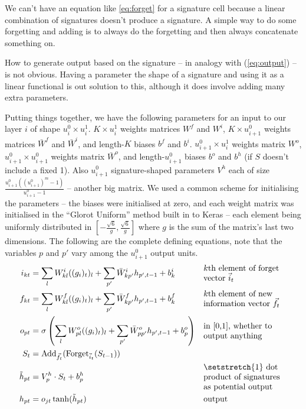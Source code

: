 We can't have an equation like \eqref{eq:forget} for a signature cell because a linear combination of signatures doesn't produce a signature. A simple way to do some forgetting and adding is to always do the forgetting and then always concatenate something on.

How to generate output based on the signature -- in analogy with (\ref*{eq:output}) -- is not obvious. Having a parameter the shape of a signature and using it as a linear functional is out solution to this, although it does involve adding many extra parameters.

Putting things together, we have the following parameters for an input to our layer $i$ of shape $u_i^0\times u_i^1$. $K\times u_i^1$ weights matrices $W^f$ and $W^i$, $K\times u_{i+1}^0$ weights matrices $\bar W^f$ and $\bar W^i$, and length-$K$ biases $b^f$ and $b^i$. $u_{i+1}^0\times u_i^1$ weights matrix $W^o$, $u_{i+1}^0\times u_{i+1}^0$ weights matrix $\bar W^o$, and length-$u_{i+1}^0$ biases $b^o$ and $b^h$ (if $S$ doesn't include a fixed 1). Also $u_{i+1}^0$ signature-shaped parameters $V^h$ each of size $\frac{u_{i+1}^0((u_{i+1}^0)^m-1)}{u_{i+1}^0-1}$ -- another big matrix. 
We used a common scheme for initialising the parameters -- the biases were initialised at zero, and each weight matrix was initialised in the ``Glorot Uniform'' method built in to Keras -- each element being uniformly distributed in $[-\frac{\sqrt 6}{g},\frac{\sqrt 6}{g}]$ where $g$ is the sum of the matrix's last two dimensions. The following are the complete defining equations, note that the variables $p$ and $p'$ vary among the $u_{i+1}^0$ output units.
\begin{align}
\inV_{kt}&=\sum_\inputindex W^\inV_{k\inputindex} ((g_i)_t)_\inputindex+\sum_{p'} \bar W^\inV_{kp'}h_{p',t-1}+b^\inV_{k}&&\text{\parbox{1.4in}{\raggedright $k$th element of forget vector $\vec \inV_{t}$}}\\
\outV_{kt}&=\sum_\inputindex W^\outV_{k\inputindex} ((g_i)_t)_\inputindex+\sum_{p'} \bar W^\outV_{kp'}h_{p',t-1}+b^\outV_{k}&&\text{\parbox{1.4in}{\raggedright $k$th element of new information vector $\vec \outV_{t}$}}\\
o_{pt}&=\sigma\left(\sum_\inputindex W^o_{p\inputindex} ((g_i)_t)_\inputindex+\sum_{p'} \bar W^o_{pp'}h_{p',t-1}+b^o_{p}\right)&&\text{\parbox{1.4in}{\raggedright in [0,1], whether to output anything}}\\
S_{t}&=\text{Add}_{\vec \outV_{t}}(\text{Forget}_{\vec \inV_{t}}(S_{t-1}))\\
\tilde h_{pt}&=V^h_{p}\cdot S_{t}+b^h_{p}&&\text{\parbox{1.4in}{\raggedright\setstretch{1} dot product of signatures as potential output}}\\
h_{pt}&=o_{jt}\tanh(\tilde h_{pt})&&\text{output}
\end{align}
